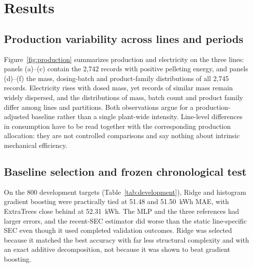 \section{Results}\label{sec:results}
\subsection{Production variability across lines and periods}
Figure~\ref{fig:production} summarizes production and electricity on the three lines: panels (a)--(c) contain the 2,742 records with positive pelleting energy, and panels (d)--(f) the mass, dosing-batch and product-family distributions of all 2,745 records. Electricity rises with dosed mass, yet records of similar mass remain widely dispersed, and the distributions of mass, batch count and product family differ among lines and partitions. Both observations argue for a production-adjusted baseline rather than a single plant-wide intensity. Line-level differences in consumption have to be read together with the corresponding production allocation: they are not controlled comparisons and say nothing about intrinsic mechanical efficiency.


\subsection{Baseline selection and frozen chronological test}
On the 800 development targets (Table~\ref{tab:development}), Ridge and histogram gradient boosting were practically tied at 51.48 and 51.50~kWh MAE, with ExtraTrees close behind at 52.31~kWh. The MLP and the three references had larger errors, and the recent-SEC estimator did worse than the static line-specific SEC even though it used completed validation outcomes. Ridge was selected because it matched the best accuracy with far less structural complexity and with an exact additive decomposition, not because it was shown to beat gradient boosting.

